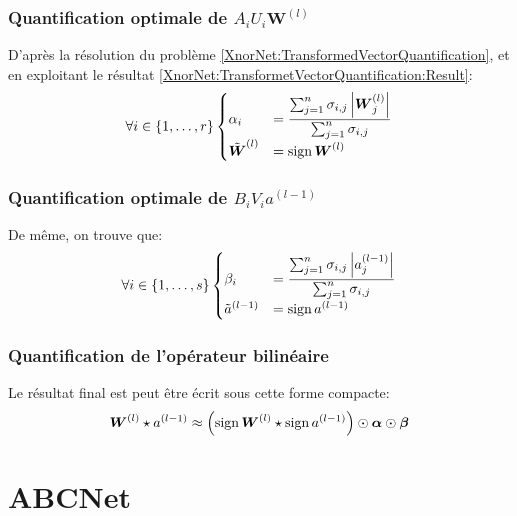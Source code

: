 \subsubsection{Quantification optimale de $A_i U_i \boldsymbol{W}^{(l)}$ }
D'après la résolution du problème \eqref{XnorNet:TransformedVectorQuantification}, et en exploitant le résultat \eqref{XnorNet:TransformetVectorQuantification:Result}:
\begin{equation}
	\forall i \in\{1,\dots,r\}	\begin{cases}
		\alpha_i &= \dfrac{\sum_{j=1}^n \sigma_{i,j}\left\lvert \boldsymbol{W}^{(l)}_j \right\rvert }{\sum_{j=1}^n \sigma_{i,j}}\\
		\tilde{\boldsymbol{W}}^{(l)} &= \operatorname{sign} \boldsymbol{W}^{(l)}
	\end{cases}
\end{equation}
\subsubsection{Quantification optimale de $B_i V_i a^{(l-1)}$ }
De même, on trouve que:
\begin{equation}
\forall i \in\{1,\dots,s\}	\begin{cases}
		\beta_i &= \dfrac{\sum_{j=1}^n \sigma_{i,j} \left\lvert a^{(l-1)}_j \right\rvert }{\sum_{j=1}^n \sigma_{i,j}}\\
		\tilde{a}^{(l-1)} &= \operatorname{sign} a^{(l-1)}
	\end{cases}
\end{equation}

\subsubsection{Quantification de l'opérateur bilinéaire}
Le résultat final est peut être écrit sous cette forme compacte:
\begin{equation}\label{XnorNet:BilnearForm:Result}
	\boldsymbol{W}^{(l)}\star a^{(l-1)} \approx  \left( \operatorname{sign} \boldsymbol{W}^{(l)} \star \operatorname{sign} a^{(l-1)}\right) \odot \boldsymbol{\alpha} \odot \boldsymbol{\beta}
\end{equation}

\pagebreak
\section{ABCNet}

